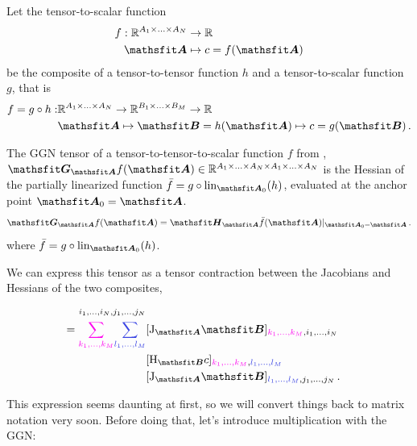 \begin{setup}\label{setup:composite_tensor_to_tensor_to_scalar_function}
  Let the tensor-to-scalar function
  \begin{align*}
    f: \sR^{A_1 \times \ldots \times A_N} & \to \sR
    \\
    \tA                                   & \mapsto c = f(\tA)
  \end{align*}
  be the composite of a tensor-to-tensor function $h$ and a tensor-to-scalar function $g$, that is
  \begin{align*}
    f = g \circ h: & \sR^{A_1 \times \ldots \times A_N} \to \sR^{B_1 \times \ldots \times B_M}  \to \sR
    \\
                   & \tA \mapsto \tB = h(\tA) \mapsto c = g(\tB)\,.
  \end{align*}
\end{setup}

\begin{definition}\label{def:general_ggn}%
  The GGN tensor of a tensor-to-tensor-to-scalar function $f$ from , $\tG_{\tA} f(\tA) \in \sR^{A_1 \times \ldots \times A_N \times A_1 \times \ldots \times A_N}$ is the Hessian of the partially linearized function $\bar{f} = g \circ \lin_{\tA_0}(h)$, evaluated at the anchor point $\tA_0 = \tA$.
  \begin{align*}
    \tG_{\tA} f(\tA)
    =
    \tH_{\tA} \bar{f}(\tA)|_{\tA_0 = \tA}\,.
  \end{align*}
  where $\bar{f} = g \circ \lin_{\tA_0}(h)$.

  We can express this tensor as a tensor contraction between the Jacobians and Hessians of the two composites, \ie 
  \begin{align*}
    [\tG_{\tA} f(\tA)]_{i_1, \ldots, i_N, j_1, \ldots, j_N}
    \\
    =
    \textcolor{VectorPink}{\sum_{k_1, \dots, k_M}}
    \textcolor{VectorBlue}{\sum_{l_1, \dots, l_M}}
     & [\jac_{\tA} \tB]_{\textcolor{VectorPink}{k_1, \dots, k_M}, i_1, \dots, i_N}
    \\
     & [\hess_{\tB} c]_{\textcolor{VectorPink}{k_{1}, \ldots, k_{M}}, \textcolor{VectorBlue}{l_{1}, \ldots, l_{M}}}
    \\
     & [\jac_{\tA} \tB]_{\textcolor{VectorBlue}{l_1, \ldots, l_M}, j_1, \ldots, j_N}\,.
  \end{align*}
\end{definition}
This expression seems daunting at first, so we will convert things back to matrix notation very soon. Before doing that, let's introduce multiplication with the GGN:

